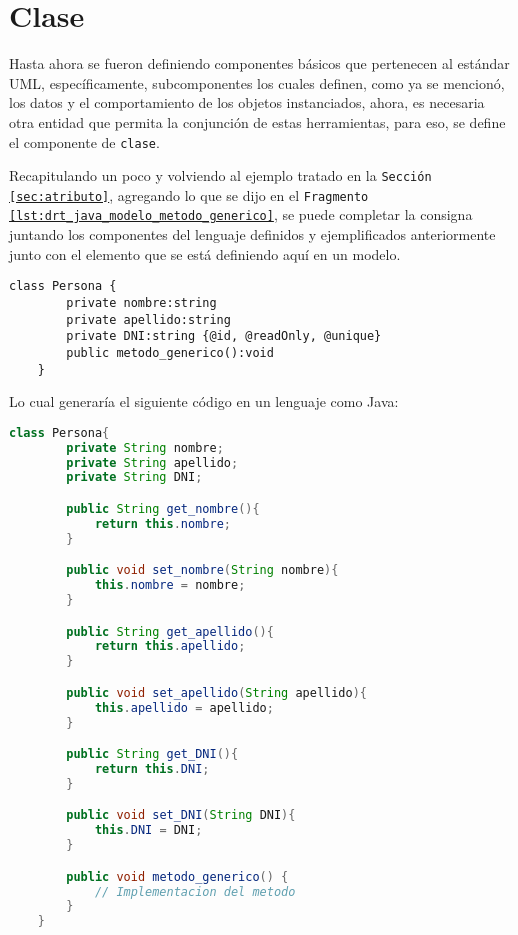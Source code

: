\section{Clase}
\label{sec:clase}
Hasta ahora se fueron definiendo componentes básicos que pertenecen al estándar
UML, específicamente, subcomponentes los cuales definen, como ya se mencionó,
los datos y el comportamiento de los objetos instanciados, ahora, es necesaria
otra entidad que permita la conjunción de estas herramientas, para eso, se
define el componente de \texttt{clase}.

Recapitulando un poco y volviendo al ejemplo tratado en la \texttt{Sección
\ref{sec:atributo}}, agregando lo que se dijo en el \texttt{Fragmento
\ref{lst:drt_java_modelo_metodo_generico}},
se puede completar la consigna juntando los componentes del lenguaje definidos
y ejemplificados anteriormente junto con el elemento que se está
definiendo aquí en un modelo.

\begin{lstlisting}[caption={Director - Adhiere componente clase al ejemplo},
basicstyle=\footnotesize\ttfamily, label=lst:drt_java_clase]
	class Persona {
		private nombre:string
		private apellido:string
		private DNI:string {@id, @readOnly, @unique}
		public metodo_generico():void
	}
\end{lstlisting}

Lo  cual generaría el siguiente código en un lenguaje como Java:

\begin{lstlisting}[caption={Java - Resultado obtenido de la generación de
\texttt{Fragmento \ref{lst:drt_java_clase}}}, language=Java, basicstyle=\footnotesize\ttfamily]
	class Persona{
		private String nombre;
		private String apellido;
		private String DNI;

		public String get_nombre(){
			return this.nombre;
		}

		public void set_nombre(String nombre){
			this.nombre = nombre;
		}

		public String get_apellido(){
			return this.apellido;
		}

		public void set_apellido(String apellido){
			this.apellido = apellido;
		}

		public String get_DNI(){
			return this.DNI;
		}

		public void set_DNI(String DNI){
			this.DNI = DNI;
		}

		public void metodo_generico() {
			// Implementacion del metodo
		}
	}
\end{lstlisting}


